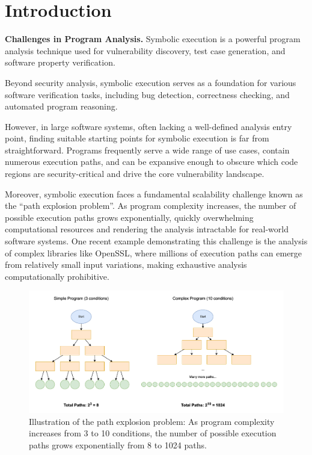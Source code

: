 \chapter{Introduction}

\textbf{Challenges in Program Analysis.} Symbolic execution is a powerful program analysis technique used for vulnerability discovery, test case generation, and software property verification.

Beyond security analysis, symbolic execution serves as a foundation for various software verification tasks, including bug detection, correctness checking, and automated program reasoning.

However, in large software systems, often lacking a well-defined analysis entry point, finding suitable starting points for symbolic execution is far from straightforward. Programs frequently serve a wide range of use cases, contain numerous execution paths, and can be expansive enough to obscure which code regions are security-critical and drive the core vulnerability landscape.

Moreover, symbolic execution faces a fundamental scalability challenge known as the ``path explosion problem''. As program complexity increases, the number of possible execution paths grows exponentially, quickly overwhelming computational resources and rendering the analysis intractable for real-world software systems. One recent example demonstrating this challenge is the analysis of complex libraries like OpenSSL, where millions of execution paths can emerge from relatively small input variations, making exhaustive analysis computationally prohibitive.

\begin{figure}[htbp]
    \centering
    \includegraphics[width=\textwidth]{Figures/path_explosion_problem}
    \caption{Illustration of the path explosion problem: As program complexity increases from 3 to 10 conditions, the number of possible execution paths grows exponentially from 8 to 1024 paths.}
    \label{fig:path_explosion_problem}
\end{figure}

